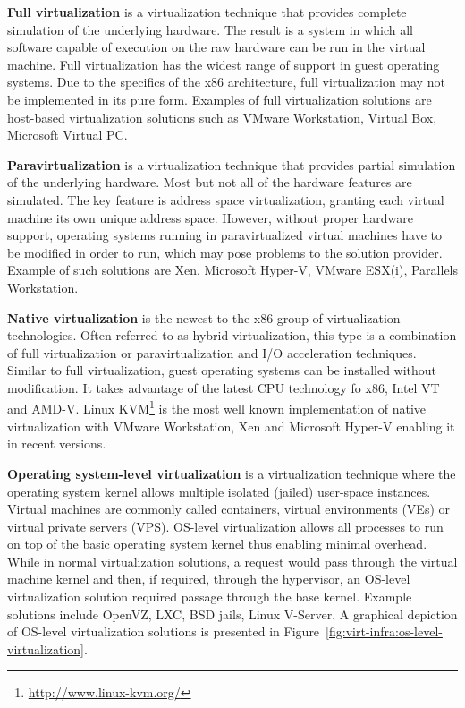 \textbf{Full virtualization} is a virtualization technique that provides
complete simulation of the underlying hardware. The result is a system in
which all software capable of execution on the raw hardware can be run in the
virtual machine. Full virtualization has the widest range of support in guest
operating systems. Due to the specifics of the x86 architecture, full
virtualization may not be implemented in its pure form. Examples of
full virtualization solutions are host-based virtualization solutions such as
VMware Workstation, Virtual Box, Microsoft Virtual PC.

\textbf{Paravirtualization} is a virtualization technique that provides
partial simulation of the underlying hardware. Most but not all of the
hardware features are simulated. The key feature is address space
virtualization, granting each virtual machine its own unique address space.
However, without proper hardware support, operating systems running in
paravirtualized virtual machines have to be modified in order to run, which
may pose problems to the solution provider. Example of such solutions are Xen,
Microsoft Hyper-V, VMware ESX(i), Parallels Workstation.

\textbf{Native virtualization} is the newest to the x86 group of
virtualization technologies. Often referred to as hybrid virtualization, this
type is a combination of full virtualization or paravirtualization and
I/O acceleration techniques. Similar to full virtualization, guest
operating systems can be installed without modification. It takes advantage of
the latest CPU technology fo x86, Intel VT and AMD-V. Linux
KVM\footnote{\url{http://www.linux-kvm.org/}} is the most
well known implementation of native virtualization with VMware Workstation,
Xen and Microsoft Hyper-V enabling it in recent versions.

\textbf{Operating system-level virtualization} is a virtualization technique
where the operating system kernel allows multiple isolated (jailed) user-space
instances. Virtual machines are commonly called containers, virtual
environments (VEs) or virtual private servers (VPS). OS-level virtualization
allows all processes to run on top of the basic operating system kernel thus
enabling minimal overhead. While in normal virtualization solutions, a request
would pass through the virtual machine kernel and then, if required, through
the hypervisor, an OS-level virtualization solution required passage through
the base kernel. Example solutions include OpenVZ, LXC, BSD jails, Linux
V-Server. A graphical depiction of OS-level virtualization solutions is
presented in Figure~\ref{fig:virt-infra:os-level-virtualization}.

